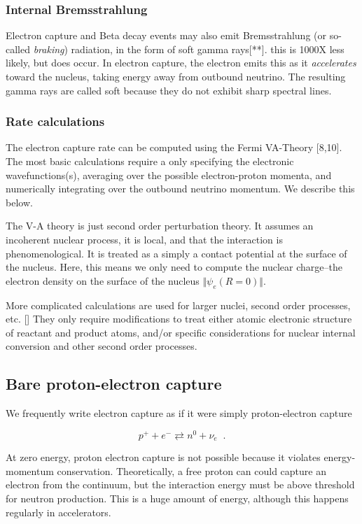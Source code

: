 \documentclass[11pt]{amsart}
\begin{document}
\subsubsection{Internal Bremsstrahlung}

Electron capture and Beta decay events may also emit Bremsstrahlung (or so-called \emph{braking}) radiation, in the form of soft gamma rays[**]. this is 1000X less likely, but does occur.  In electron capture, the electron emits this as it \emph{accelerates} toward the nucleus, taking energy away from outbound neutrino.  The resulting gamma rays are called soft because they do not exhibit sharp spectral lines.  

\subsubsection{Rate calculations}

The electron capture rate can be computed using the Fermi VA-Theory [8,10].  The most basic calculations require a only specifying the electronic wavefunctions(s), averaging over the possible electron-proton momenta, and numerically integrating over the outbound neutrino momentum.  We describe this below.

The V-A theory is just second order perturbation theory.  It assumes an incoherent nuclear process, it is local, and that the interaction is phenomenological. It is treated as a simply a contact potential at the surface of the nucleus. Here, this means we only need to compute the nuclear charge--the electron density on the surface of the nucleus $\Vert\psi_{e}(R=0)\Vert$.  

More complicated calculations are used for larger nuclei, second order processes, etc. []  They only require modifications to treat either atomic electronic structure of reactant and product atoms, and/or specific considerations for nuclear internal conversion and other second order processes.

\subsection{Bare proton-electron capture}


We frequently write electron capture as if it were simply proton-electron capture

$$p^{+}+e^{-} \rightleftarrows n^{0}+\nu_{e}\;\;.$$

At zero energy, proton electron capture is not possible because it violates energy-momentum conservation. Theoretically, a free proton can could capture an electron from the continuum, but the interaction energy must be  above threshold for neutron production.  This is a huge amount of energy, although this happens regularly in accelerators.
\end{document}
